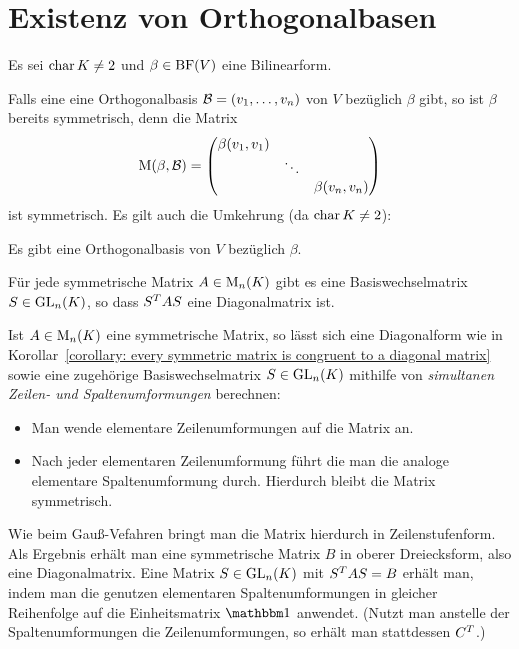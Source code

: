 \section{Existenz von Orthogonalbasen}

Es sei $\operatorname{char} K \neq 2$ und $\beta \in \operatorname{BF}(V)$ eine Bilinearform.

Falls eine eine Orthogonalbasis $\mathcal{B} = (v_1, \dotsc, v_n)$ von $V$ bezüglich $\beta$ gibt, so ist $\beta$ bereits symmetrisch, denn die Matrix
\[
    \operatorname{M}(\beta, \mathcal{B})
  = \begin{pmatrix}
      \beta(v_1, v_1) &         &                 \\
                      & \ddots  &                 \\
                      &         & \beta(v_n, v_n)
    \end{pmatrix}
\]
ist symmetrisch.
Es gilt auch die Umkehrung (da $\operatorname{char} K \neq 2$):

\begin{theorem}
  \label{theorem: exstience of an orthogonal basis}
  Es gibt eine Orthogonalbasis von $V$ bezüglich $\beta$.
\end{theorem}

\begin{corollary}
  \label{corollary: every symmetric matrix is congruent to a diagonal matrix}
  Für jede symmetrische Matrix $A \in \operatorname{M}_{n}(K)$ gibt es eine Basiswechselmatrix $S \in \operatorname{GL}_{n}(K)$, so dass $S^T A S$ eine Diagonalmatrix ist.
\end{corollary}

Ist $A \in \operatorname{M}_{n}(K)$ eine symmetrische Matrix, so lässt sich eine Diagonalform wie in Korollar~\ref{corollary: every symmetric matrix is congruent to a diagonal matrix} sowie eine zugehörige Basiswechselmatrix $S \in \operatorname{GL}_{n}(K)$ mithilfe von \emph{simultanen Zeilen- und Spaltenumformungen} berechnen:
\begin{itemize}
  \item
    Man wende elementare Zeilenumformungen auf die Matrix an.
  \item
    Nach jeder elementaren Zeilenumformung führt die man die analoge elementare Spaltenumformung durch.
    Hierdurch bleibt die Matrix symmetrisch.
\end{itemize}
Wie beim Gauß-Vefahren bringt man die Matrix hierdurch in Zeilenstufenform.
Als Ergebnis erhält man eine symmetrische Matrix $B$ in oberer Dreiecksform, also eine Diagonalmatrix.
Eine Matrix $S \in \operatorname{GL}_{n}(K)$ mit $S^T A S = B$ erhält man, indem man die genutzen elementaren Spaltenumformungen in gleicher Reihenfolge auf die Einheitsmatrix $\Id$ anwendet.
(Nutzt man anstelle der Spaltenumformungen die Zeilenumformungen, so erhält man stattdessen $C^T$.)

